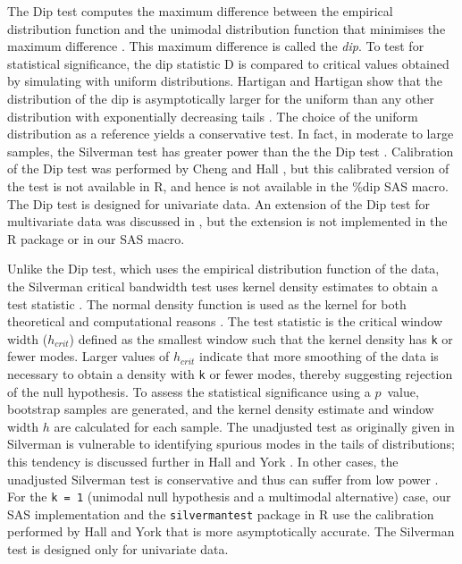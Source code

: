 \documentclass[]{interact}
\theoremstyle{plain}%
\theoremstyle{definition}
\theoremstyle{remark}
\begin{document}
The Dip test computes the maximum difference between the empirical distribution function and the unimodal distribution function that minimises the maximum difference \citep{hartigan1985dip}. This maximum difference is called the \textit{dip}. To test for statistical significance, the dip statistic D is compared to critical values obtained by simulating with uniform distributions. Hartigan and Hartigan show that the distribution of the dip is asymptotically larger for the uniform than any other distribution with exponentially decreasing tails \cite{hartigan1985dip}. The choice of the uniform distribution as a reference yields a conservative test. In fact, in moderate to large samples, the Silverman test has greater power than the the Dip test \citep{cheng1998calibrating}. Calibration of the Dip test was performed by Cheng and Hall \cite{cheng1998calibrating}, but this calibrated version of the test is not available in R, and hence is not available in the \%dip SAS macro. The Dip test is designed for univariate data. An extension of the Dip test for multivariate data was discussed in \cite{hartigan1985dip}, but the extension is not implemented in the R package or in our SAS macro.

Unlike the Dip test, which uses the empirical distribution function of the data, the Silverman critical bandwidth test uses kernel density estimates to obtain a test statistic \citep{silverman1981using}.  The normal density function is used as the kernel for both theoretical and computational reasons \citep{silverman1981using}. The test statistic is the critical window width ($h_{crit}$) defined as the smallest window such that the kernel density has \texttt{k} or fewer modes. Larger values of $h_{crit}$ indicate that more smoothing of the data is necessary to obtain a density with \texttt{k} or fewer modes, thereby suggesting rejection of the null hypothesis. To assess the statistical significance using a $p$~value, bootstrap samples are generated, and the kernel density estimate and window width $h$ are calculated for each sample. The unadjusted test as originally given in Silverman \cite{silverman1981using} is vulnerable to identifying spurious modes in the tails of distributions; this tendency is discussed further in Hall and York \cite{hall2001calibration}. In other cases, the unadjusted Silverman test is conservative and thus can suffer from low power \citep{hall2001calibration}. For the \texttt{k = 1} (unimodal null hypothesis and a multimodal alternative) case, our SAS implementation and the \texttt{silvermantest} \citep{silvermanpkg} package in R use the calibration performed by Hall and York that is more asymptotically accurate. 
The Silverman test is designed only for univariate data.
\end{document}
